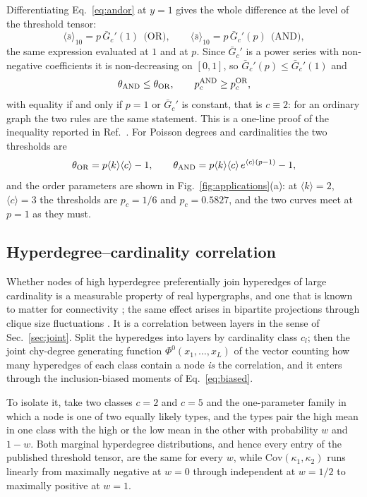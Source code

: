 \documentclass[aps,pre,twocolumn,superscriptaddress,floatfix,longbibliography]{revtex4-2}
\newcommand{\ave}[1]{\langle #1 \rangle}
\begin{document}
Differentiating Eq.~\eqref{eq:andor} at $y=1$ gives the whole difference at the
level of the threshold tensor:
\begin{equation}
  \ave{\bar s}_{10}=p\,\bar G_c'(1)\ \ \text{(OR)},\qquad
  \ave{\bar s}_{10}=p\,\bar G_c'(p)\ \ \text{(AND)},
  \label{eq:andors}
\end{equation}
the same expression evaluated at $1$ and at $p$. Since $\bar G_c'$ is a power
series with non-negative coefficients it is non-decreasing on $[0,1]$, so
$\bar G_c'(p)\le\bar G_c'(1)$ and
\begin{equation}
  \theta_{\rm AND}\le\theta_{\rm OR},\qquad p_c^{\rm AND}\ge p_c^{\rm OR},
\end{equation}
with equality if and only if $p=1$ or $\bar G_c'$ is constant, that is
$c\equiv2$: for an ordinary graph the two rules are the same statement. This is
a one-line proof of the inequality reported in Ref.~\cite{bianconi2024}. For
Poisson degrees and cardinalities the two thresholds are
\begin{equation}
  \theta_{\rm OR}=p\ave{k}\ave{c}-1,\qquad
  \theta_{\rm AND}=p\ave{k}\ave{c}\,e^{\ave{c}(p-1)}-1,
\end{equation}
and the order parameters are shown in Fig.~\ref{fig:applications}(a): at
$\ave{k}=2$,
$\ave{c}=3$ the thresholds are $p_c=1/6$ and $p_c=0.5827$, and the two curves
meet at $p=1$ as they must.

\subsection{Hyperdegree--cardinality correlation}

Whether nodes of high hyperdegree preferentially join hyperedges of large
cardinality is a measurable property of real hypergraphs, and one that is known
to matter for connectivity \cite{ha2025,valdez2026}; the same effect arises in
bipartite projections through clique size fluctuations \cite{fujiki2024}. It is
a correlation between layers in the sense of Sec.~\ref{sec:joint}. Split the hyperedges into
layers by cardinality class $c_l$; then the joint chy-degree generating function
$\Phi^0(x_1,\dots,x_L)$ of the vector counting how many hyperedges of each class
contain a node \emph{is} the correlation, and it enters through the
inclusion-biased moments of Eq.~\eqref{eq:biased}.

To isolate it, take two classes $c=2$ and $c=5$ and the one-parameter family in
which a node is one of two equally likely types, and the types pair the high
mean in one class with the high or the low mean in the other with probability
$w$ and $1-w$. Both marginal hyperdegree distributions, and hence every entry
of the published threshold tensor, are the same for every $w$, while
$\mathrm{Cov}(\kappa_1,\kappa_2)$ runs linearly from maximally negative at $w=0$
through independent at $w=1/2$ to maximally positive at $w=1$.
\end{document}

